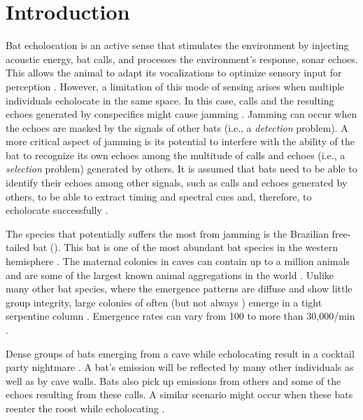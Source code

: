\documentclass[a4paper, 11pt]{article}
\begin{document}
\section{Introduction}

Bat echolocation is an active sense that stimulates the environment by injecting acoustic energy, bat calls, and processes the environment's response, sonar echoes. This allows the animal to adapt its vocalizations to optimize sensory input for perception \citep{Hofmann2013}. However, a limitation of this mode of sensing arises when multiple individuals echolocate in the same space. In this case, calls and the resulting echoes generated by conspecifics might cause jamming \cite{Ulanovsky2004}. Jamming can occur when the echoes are masked by the signals of other bats (i.e., a \emph{detection} problem). A more critical aspect of jamming is its potential to interfere with the ability of the bat to recognize its own echoes among the multitude of calls and echoes (i.e., a \emph{selection} problem) generated by others. It is assumed that bats need to be able to identify their echoes among other signals, such as calls and echoes generated by others, to be able to extract timing and spectral cues and, therefore, to echolocate successfully \citep[e.g.,][]{Goetze2016,Corcoran2017,Amichai2015}.  

The species that potentially suffers the most from jamming is the Brazilian free-tailed bat (). This bat is one of the most abundant bat species in the western hemisphere \citep{Armstrong2008}. The maternal colonies in caves can contain up to a million animals \citep{Gillam2010, Betke2008} and are some of the largest known animal aggregations in the world \citep{Kloepper2016}. Unlike many other bat species, where the emergence patterns are diffuse and show little group integrity, large colonies of  often (but not always \citep{Wilkins1989}) emerge in a tight serpentine column \citep{Wilkins1989,Gillam2010}. Emergence rates can vary from 100 to more than 30,000/min \citep{Gillam2010,Betke2008}.

Dense groups of bats emerging from a cave while echolocating \citep{Eveland2023,Ulanovsky2008,Betke2008} result in a cocktail party nightmare \citep{Ulanovsky2008,Gillam2010}. A bat's emission will be reflected by many other individuals as well as by cave walls. Bats also pick up emissions from others and some of the echoes resulting from these calls. A similar scenario might occur when these bats reenter the roost while echolocating \citep{Pudlo2019}. 
\end{document}
